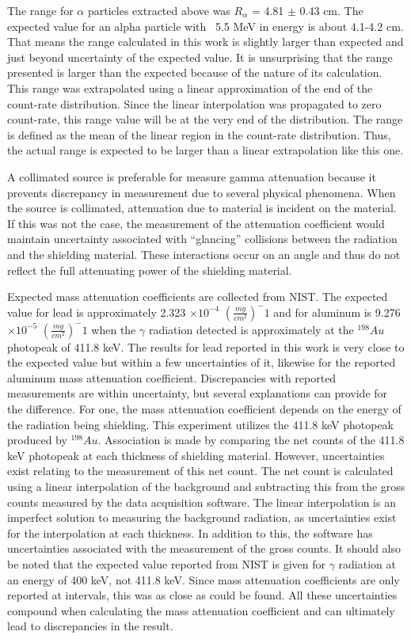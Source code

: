 The range for $\alpha$ particles extracted above was $R_{\alpha}$ = 4.81 $\pm$ 0.43 cm. The expected value for an alpha particle with ~5.5 MeV in energy is about 4.1-4.2 cm. That means the range calculated in this work is slightly larger than expected and just beyond uncertainty of the expected value. It is unsurprising that the range presented is larger than the expected because of the nature of its calculation. This range was extrapolated using a linear approximation of the end of the count-rate distribution. Since the linear interpolation was propagated to zero count-rate, this range value will be at the very end of the distribution. The range is defined as the mean of the linear region in the count-rate distribution. Thus, the actual range is expected to be larger than a linear extrapolation like this one.

A collimated source is preferable for measure gamma attenuation because it prevents discrepancy in measurement due to several physical phenomena. When the source is collimated, attenuation due to material is incident on the material. If this was not the case, the measurement of the attenuation coefficient would maintain uncertainty associated with “glancing” collisions between the radiation and the shielding material. These interactions occur on an angle and thus do not reflect the full attenuating power of the shielding material.

Expected mass attenuation coefficients are collected from NIST. The expected value for lead is approximately 2.323 $\times 10^{-4}$ $(\frac{mg}{cm^2})^-1$ and for aluminum is 9.276 $\times 10^{-5}$ $(\frac{mg}{cm^2})^-1$ when the $\gamma$ radiation detected is approximately at the ${}^{198}Au$ photopeak of 411.8 keV. The results for lead reported in this work is very close to the expected value but within a few uncertainties of it, likewise for the reported aluminum mass attenuation coefficient. Discrepancies with reported measurements are within uncertainty, but several explanations can provide for the difference. For one, the mass attenuation coefficient depends on the energy of the radiation being shielding. This experiment utilizes the 411.8 keV photopeak produced by ${}^{198}Au$. Association is made by comparing the net counts of the 411.8 keV photopeak at each thickness of shielding material. However, uncertainties exist relating to the measurement of this net count. The net count is calculated using a linear interpolation of the background and subtracting this from the gross counts measured by the data acquisition software. The linear interpolation is an imperfect solution to measuring the background radiation, as uncertainties exist for the interpolation at each thickness. In addition to this, the software has uncertainties associated with the measurement of the gross counts. It should also be noted that the expected value reported from NIST is given for $\gamma$ radiation at an energy of 400 keV, not 411.8 keV. Since mass attenuation coefficients are only reported at intervals, this was as close as could be found. All these uncertainties compound when calculating the mass attenuation coefficient and can ultimately lead to discrepancies in the result.

